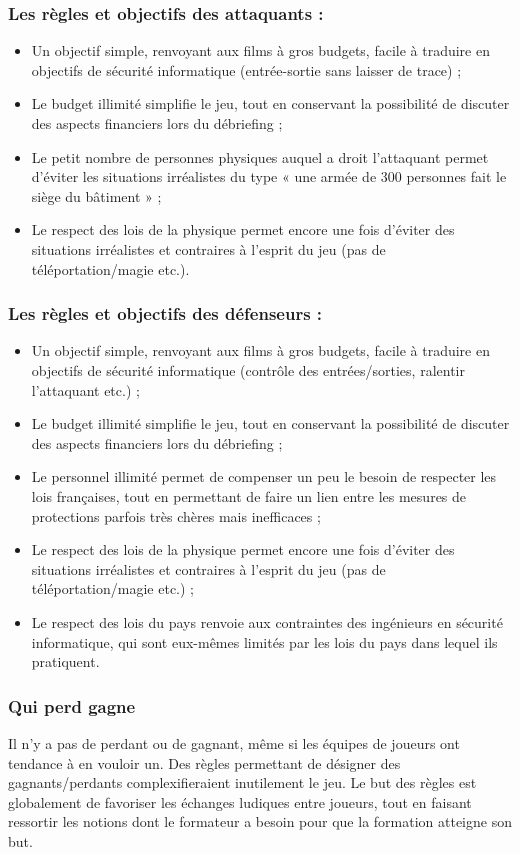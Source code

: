 \documentclass[11pt]{article} %
\begin{document}
\subsubsection{Les règles et objectifs des attaquants :}
\begin{itemize}
\item Un objectif simple, renvoyant aux films à gros budgets, facile à traduire
en objectifs de sécurité informatique (entrée-sortie sans laisser de trace) ;
\item Le budget illimité simplifie le jeu, tout en conservant la possibilité de
discuter des aspects financiers lors du débriefing ;
\item Le petit nombre de personnes physiques auquel a droit l'attaquant permet
d'éviter les situations irréalistes du type « une armée de 300 personnes fait le
siège du bâtiment » ;
\item Le respect des lois de la physique permet encore une fois d'éviter des
situations irréalistes et contraires à l'esprit du jeu (pas de
téléportation/magie etc.).
\end{itemize}

\subsubsection{Les règles et objectifs des défenseurs :}
\begin{itemize}
\item Un objectif simple, renvoyant aux films à gros budgets, facile à traduire
en objectifs de sécurité informatique (contrôle des entrées/sorties, ralentir
l'attaquant etc.) ;
\item Le budget illimité simplifie le jeu, tout en conservant la possibilité de
discuter des aspects financiers lors du débriefing ;
\item Le personnel illimité permet de compenser un peu le besoin de respecter
les lois françaises, tout en permettant de faire un lien entre les mesures de
protections parfois très chères mais inefficaces ;
\item Le respect des lois de la physique permet encore une fois d'éviter des
situations irréalistes et contraires à l'esprit du jeu (pas de
téléportation/magie etc.) ;
\item Le respect des lois du pays renvoie aux contraintes des ingénieurs en
sécurité informatique, qui sont eux-mêmes limités par les lois du pays dans
lequel ils pratiquent.
\end{itemize}

\subsubsection{Qui perd gagne}
Il n'y a pas de perdant ou de gagnant, même si les équipes de joueurs ont
tendance à en vouloir un. Des règles permettant de désigner des
gagnants/perdants complexifieraient inutilement le jeu. Le but des règles est
globalement de favoriser les échanges ludiques entre joueurs, tout en faisant
ressortir les notions dont le formateur a besoin pour que la formation atteigne
son but.
\end{document}

